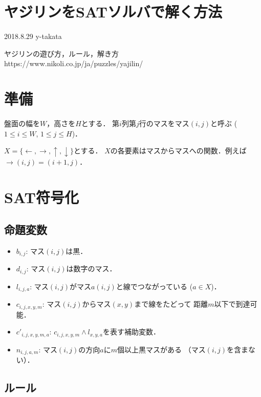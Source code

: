 \documentclass[a4j]{jarticle}
\newcommand{\←}{{\leftarrow}}
\newcommand{\→}{{\rightarrow}}
\newcommand{\↑}{{\uparrow}}
\newcommand{\↓}{{\downarrow}}
\begin{document}
\section*{ヤジリンをSATソルバで解く方法}
\begin{flushright}
2018.8.29 y-takata
\end{flushright}

ヤジリンの遊び方，ルール，解き方\\
https://www.nikoli.co.jp/ja/puzzles/yajilin/

\section{準備}
盤面の幅を$W$，高さを$H$とする．
第$i$列第$j$行のマスをマス$(i,j)$と呼ぶ ($1\le i\le W$, $1\le j\le H$)．

$X=\{\←,\→,\↑,\↓\}$とする．
$X$の各要素はマスからマスへの関数．例えば$\→(i,j)=(i+1,j)$．

\section{SAT符号化}
\subsection{命題変数}
\begin{itemize}
\item $b_{i,j}$: マス$(i,j)$は黒．
\item $d_{i,j}$: マス$(i,j)$は数字のマス．
\item $l_{i,j,a}$: マス$(i,j)$がマス$a(i,j)$と線でつながっている ($a\in X$)．
\item $c_{i,j,x,y,m}$: マス$(i,j)$からマス$(x,y)$まで線をたどって
  距離$m$以下で到達可能．
\item $c'_{i,j,x,y,m,a}$: $c_{i,j,x,y,m}\land l_{x,y,a}$を表す補助変数．
\item $n_{i,j,a,m}$: マス$(i,j)$の方向$a$に$m$個以上黒マスがある
  （マス$(i,j)$を含まない）．
\end{itemize}

\subsection{ルール}
\end{document}
